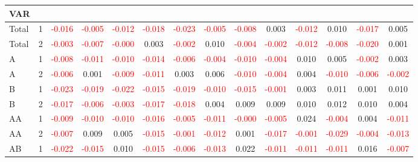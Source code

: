 \begin{table}[!htb]
{\begin{tabular}{llcccccccccccc}
\hline
VAR &  &  &  &  &  &  &  &  &  &  &  &  & \\
\hline
Total & 1 & \textcolor{red}{-0.016} & \textcolor{red}{-0.005} & \textcolor{red}{-0.012} & \textcolor{red}{-0.018} & \textcolor{red}{-0.023} & \textcolor{red}{-0.005} & \textcolor{red}{-0.008} & 0.003 & \textcolor{red}{-0.012} & 0.010 & \textcolor{red}{-0.017} & 0.005\\
Total & 2 & \textcolor{red}{-0.003} & \textcolor{red}{-0.007} & \textcolor{red}{-0.000} & 0.003 & \textcolor{red}{-0.002} & 0.010 & \textcolor{red}{-0.004} & \textcolor{red}{-0.002} & \textcolor{red}{-0.012} & \textcolor{red}{-0.008} & \textcolor{red}{-0.020} & 0.001\\
A & 1 & \textcolor{red}{-0.008} & \textcolor{red}{-0.011} & \textcolor{red}{-0.010} & \textcolor{red}{-0.014} & \textcolor{red}{-0.006} & \textcolor{red}{-0.004} & \textcolor{red}{-0.010} & \textcolor{red}{-0.004} & 0.010 & 0.005 & \textcolor{red}{-0.002} & 0.003\\
A & 2 & \textcolor{red}{-0.006} & 0.001 & \textcolor{red}{-0.009} & \textcolor{red}{-0.011} & 0.003 & 0.006 & \textcolor{red}{-0.010} & \textcolor{red}{-0.004} & 0.004 & \textcolor{red}{-0.010} & \textcolor{red}{-0.006} & \textcolor{red}{-0.002}\\
B & 1 & \textcolor{red}{-0.023} & \textcolor{red}{-0.019} & \textcolor{red}{-0.022} & \textcolor{red}{-0.015} & \textcolor{red}{-0.019} & \textcolor{red}{-0.010} & \textcolor{red}{-0.015} & \textcolor{red}{-0.001} & 0.003 & 0.011 & 0.001 & 0.010\\
B & 2 & \textcolor{red}{-0.017} & \textcolor{red}{-0.006} & \textcolor{red}{-0.003} & \textcolor{red}{-0.017} & \textcolor{red}{-0.018} & 0.004 & 0.009 & 0.009 & 0.010 & 0.012 & 0.010 & 0.004\\
AA & 1 & \textcolor{red}{-0.009} & \textcolor{red}{-0.010} & \textcolor{red}{-0.010} & \textcolor{red}{-0.016} & \textcolor{red}{-0.005} & \textcolor{red}{-0.011} & \textcolor{red}{-0.000} & \textcolor{red}{-0.005} & 0.024 & \textcolor{red}{-0.004} & 0.004 & \textcolor{red}{-0.011}\\
AA & 2 & \textcolor{red}{-0.007} & 0.009 & 0.005 & \textcolor{red}{-0.015} & \textcolor{red}{-0.001} & \textcolor{red}{-0.012} & 0.001 & \textcolor{red}{-0.017} & \textcolor{red}{-0.001} & \textcolor{red}{-0.029} & \textcolor{red}{-0.004} & \textcolor{red}{-0.013}\\
AB & 1 & \textcolor{red}{-0.022} & \textcolor{red}{-0.015} & 0.010 & \textcolor{red}{-0.015} & \textcolor{red}{-0.006} & \textcolor{red}{-0.013} & 0.022 & \textcolor{red}{-0.011} & \textcolor{red}{-0.011} & \textcolor{red}{-0.011} & 0.016 & \textcolor{red}{-0.007}\\

\end{tabular}}
\end{table}

